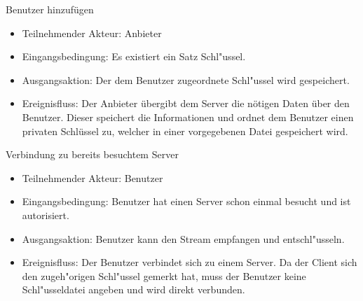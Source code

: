 \documentclass[a4paper,10pt]{scrartcl}
\begin{document}
\begin{usecase}

 {Benutzer hinzufügen
   \begin{itemize}
   \item Teilnehmender Akteur: Anbieter
   \item Eingangsbedingung: Es existiert ein Satz Schl"ussel.
   \item Ausgangsaktion: Der dem Benutzer zugeordnete Schl"ussel wird gespeichert.
   \item Ereignisfluss: Der Anbieter übergibt dem Server die nötigen Daten über den Benutzer.
         Dieser speichert die Informationen und ordnet dem Benutzer einen privaten Schlüssel
         zu, welcher in einer vorgegebenen Datei gespeichert wird.
   \end{itemize}
}
 {Verbindung zu bereits besuchtem Server
   \begin{itemize}
   \item Teilnehmender Akteur: Benutzer
   \item Eingangsbedingung: Benutzer hat einen Server schon einmal besucht und ist
         autorisiert.
   \item Ausgangsaktion: Benutzer kann den Stream empfangen und entschl"usseln.
   \item Ereignisfluss: Der Benutzer verbindet sich zu einem Server. Da der Client sich
         den zugeh"origen Schl"ussel gemerkt hat, muss der Benutzer keine Schl"usseldatei
         angeben und wird direkt verbunden.
   \end{itemize}
}


\end{usecase}
\end{document}
